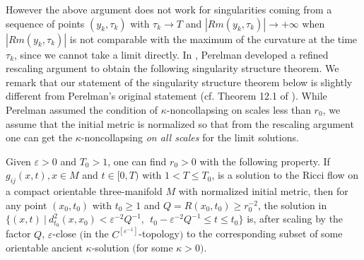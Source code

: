 However the above argument does not work for singularities coming
from a sequence of points $(y_k,\tau_k)$ with $\tau_k \rightarrow T$
and $|Rm(y_k,\tau_k)| \rightarrow +\infty$ when $|Rm(y_k,\tau_k)|$
is not comparable with the maximum of the curvature at the time
$\tau_k$, since we cannot take a limit directly. In \cite{P1},
Perelman developed a refined rescaling argument to obtain the
following singularity structure theorem. We remark that our
statement of the singularity structure theorem below is slightly
different from Perelman's original statement (cf. Theorem 12.1 of
\cite{P1}). While Perelman assumed the condition of
$\kappa$-noncollapsing on scales less than $r_0$, we assume that the
initial metric is normalized so that from the rescaling argument one
can get the $\kappa$-noncollapsing \emph{on all scales} for the
limit solutions.

\begin{theorem}
  \label{thm:cz-three-dimensional-singularity-structure}
 Given $\varepsilon>0$ and $T_0 >1$, one can
find $r_0>0$ with the following property. If $g_{ij}(x,t), x\in M$
and $t\in [0,T)$ with $1 < T \leq T_0$, is a solution to the Ricci
flow on a compact orientable three-manifold $M$ with normalized
initial metric, then for any point $(x_0,t_0)$ with $t_0\geq 1$
and $Q=R(x_0,t_0)\geq r_0^{-2}$, the solution in $\{(x,t)\ |\
d_{t_0}^2(x,x_0)<\varepsilon^{-2} Q^{-1},\ \ t_0-\varepsilon^{-2}
Q^{-1}\leq t\leq t_0\}$ is, after scaling by the factor $Q$,
$\varepsilon$-close $($in the $C^{[\varepsilon^{-1}]}$-topology$)$
to the corresponding subset of some orientable ancient
$\kappa$-solution $($for some $\kappa >0)$.
\end{theorem}

